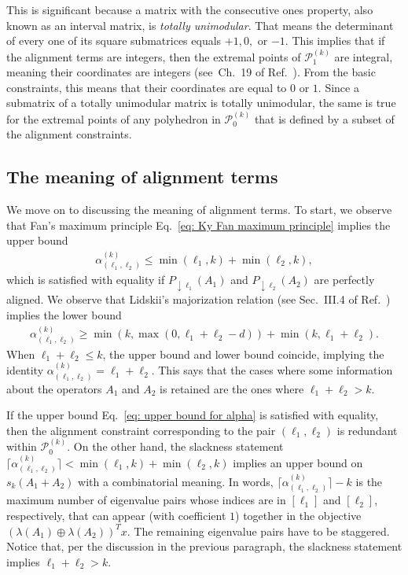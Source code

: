 \documentclass[12pt]{article}
\theoremstyle{definition}
\numberwithin{equation}{section}
\numberwithin{equation}{section}
\newcommand{\al}{\alpha}
\newcommand{\la}{\lambda}
\newcommand{\da}{\downarrow}
\newcommand{\cP}{\mathcal{P}}
\begin{document}
This is significant because a matrix with the consecutive ones property, also known as an interval matrix, is \textit{totally unimodular}. That means the determinant of every one of its square submatrices equals \(+1, 0,\) or \(-1\). This implies that if the alignment terms are integers, then the extremal points of \(\cP_1^{(k)}\) are integral, meaning their coordinates are integers (see~Ch.~19 of Ref.~\cite{Schrijver1998}). From the basic constraints, this means that their coordinates are equal to \(0\) or \(1\). Since a submatrix of a totally unimodular matrix is totally unimodular, the same is true for the extremal points of any polyhedron in \(\cP_0^{(k)}\) that is defined by a subset of the alignment constraints.




\subsection{The meaning of alignment terms}
\label{subsec: alignment terms}
We move on to discussing the meaning of alignment terms. To start, we observe that Fan's maximum principle Eq.~\ref{eq: Ky Fan maximum principle} implies the upper bound 
\begin{align}
\label{eq: upper bound for alpha}
\al_{(\ell_1, \ell_2)}^{(k)} \leq \min(\ell_1, k) + \min(\ell_2, k),
\end{align}
which is satisfied with equality if \(P_{\da \ell_1} (A_1) \) and \(P_{\da \ell_2} (A_2)\) are perfectly aligned. We observe that Lidskii's majorization relation (see Sec.~III.4 of Ref.~\cite{Bhatia1997}) implies the lower bound
\begin{align}
\label{eq: lower bound for alpha}
\al_{(\ell_1, \ell_2)}^{(k)} \geq \min ( k, \max(0, \ell_1 + \ell_2 - d)) + \min(k, \ell_1 + \ell_2). 
\end{align}
When \(\ell_1 + \ell_2 \leq k\), the upper bound and lower bound coincide, implying the identity \(\al_{(\ell_1, \ell_2)}^{(k)} = \ell_1 + \ell_2\). This says that the cases where some information about the operators \(A_1\) and \(A_2\) is retained are the ones where \(\ell_1 + \ell_2 > k\). 







If the upper bound Eq.~\ref{eq: upper bound for alpha} is satisfied with equality, then the alignment constraint corresponding to the pair \((\ell_1, \ell_2)\) is redundant within \(\cP_0^{(k)}\). On the other hand, the slackness statement  \(\lceil \al_{(\ell_1, \ell_2)}^{(k)} \rceil < \min(\ell_1, k) + \min(\ell_2, k)\) implies an upper bound on \(s_k (A_1 + A_2)\) with a combinatorial meaning. In words, \(\lceil \al_{(\ell_1, \ell_2)}^{(k)} \rceil - k\) is the maximum number of eigenvalue pairs whose indices are in \([\ell_1]\) and \([\ell_2]\), respectively, that can appear (with coefficient \(1\)) together in the objective \((\la (A_1) \oplus \la(A_2))^T x\). The remaining eigenvalue pairs have to be staggered. Notice that, per the discussion in the previous paragraph, the slackness statement implies \(\ell_1 + \ell_2 > k\).
\end{document}
